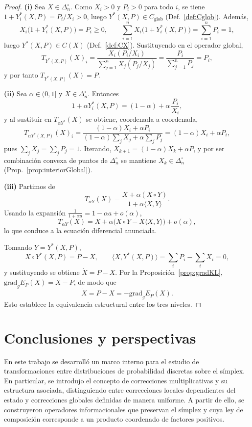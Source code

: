 \documentclass[12pt]{article}
\begin{document}
\begin{proof}
\noindent\textbf{(i)} Sea $X\in\Delta_n^\circ$. Como $X_i>0$ y $P_i>0$ para todo $i$,
se tiene $1+Y^*_i(X,P)=P_i/X_i>0$, luego $Y^*(X,P)\in C_{\mathrm{glob}}$
(Def.~\ref{def:Cglob}). Además,
\[
X_i\bigl(1+Y^*_i(X,P)\bigr)=P_i\ge 0,
\qquad
\sum_{i=1}^n X_i\bigl(1+Y^*_i(X,P)\bigr)=\sum_{i=1}^n P_i=1,
\]
luego $Y^*(X,P)\in C(X)$ (Def.~\ref{def:CX}). Sustituyendo en el operador global,
\[
T_{Y^*(X,P)}(X)_i
=
\frac{X_i(P_i/X_i)}{\sum_{j=1}^n X_j(P_j/X_j)}
=
\frac{P_i}{\sum_{j=1}^n P_j}
=
P_i,
\]
y por tanto $T_{Y^*(X,P)}(X)=P$.

\smallskip
\noindent\textbf{(ii)} Sea $\alpha\in(0,1]$ y $X\in\Delta_n^\circ$. Entonces
\[
1+\alpha Y^*_i(X,P)
=
(1-\alpha)+\alpha\,\frac{P_i}{X_i},
\]
y al sustituir en $T_{\alpha Y^*}(X)$ se obtiene, coordenada a coordenada,
\[
T_{\alpha Y^*(X,P)}(X)_i
=
\frac{(1-\alpha)X_i+\alpha P_i}{(1-\alpha)\sum_{j}X_j+\alpha\sum_{j}P_j}
=
(1-\alpha)X_i+\alpha P_i,
\]
pues $\sum_j X_j=\sum_j P_j=1$. Iterando, $X_{k+1}=(1-\alpha)X_k+\alpha P$, y por
ser combinación convexa de puntos de $\Delta_n^\circ$ se mantiene
$X_k\in\Delta_n^\circ$ (Prop.~\ref{prop:interiorGlobal}).

\smallskip
\noindent\textbf{(iii)} Partimos de
\[
T_{\alpha Y}(X)
=
\frac{X+\alpha(X\circ Y)}{1+\alpha\langle X,Y\rangle}.
\]
Usando la expansión $\frac{1}{1+\alpha a}=1-\alpha a+o(\alpha)$,
\[
T_{\alpha Y}(X)
=
X+\alpha\bigl(X\circ Y-X\langle X,Y\rangle\bigr)+o(\alpha),
\]
lo que conduce a la ecuación diferencial anunciada.

Tomando $Y=Y^*(X,P)$,
\[
X\circ Y^*(X,P)=P-X,
\qquad
\langle X,Y^*(X,P)\rangle=\sum_i P_i-\sum_i X_i=0,
\]
y sustituyendo se obtiene $\dot X=P-X$. Por la
Proposición~\ref{prop:gradKL}, $\mathrm{grad}_g E_P(X)=X-P$, de modo que
\[
\dot X=P-X=-\mathrm{grad}_g E_P(X).
\]
Esto establece la equivalencia estructural entre los tres niveles.
\end{proof}

\section{Conclusiones y perspectivas}

En este trabajo se desarrolló un marco interno para el estudio de transformaciones entre distribuciones de probabilidad discretas sobre el símplex. En particular, se introdujo el concepto de correcciones multiplicativas y su estructura asociada, distinguiendo entre correcciones locales dependientes del estado y correcciones globales definidas de manera uniforme. A partir de ello, se construyeron operadores informacionales que preservan el símplex y cuya ley de composición corresponde a un producto coordenado de factores positivos.
\end{document}
